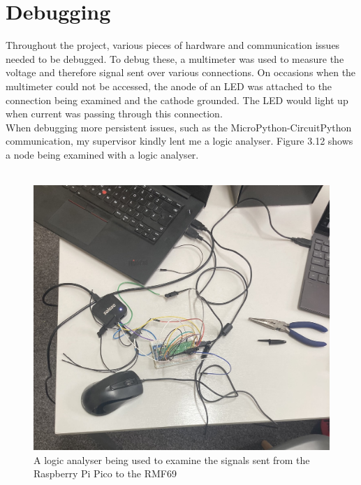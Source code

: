 \documentclass[12pt,a4paper]{report}
\begin{document}
\section{Debugging}
Throughout the project, various pieces of hardware and communication issues needed to be debugged. To debug these, a multimeter was used to measure the voltage and therefore signal sent over various connections. On occasions when the multimeter could not be accessed, the anode of an LED was attached to the connection being examined and the cathode grounded. The LED would light up when current was passing through this connection. \\
When debugging more persistent issues, such as the MicroPython-CircuitPython communication, my supervisor kindly lent me a logic analyser. Figure 3.12 shows a node being examined with a logic analyser. \\ \\ 
\begin{figure}[h]
\begin{center}
\includegraphics[scale=0.2]{logicAnalyser.jpeg}
\end{center}
\caption{A logic analyser being used to examine the signals sent from the Raspberry Pi Pico to the RMF69}
\end{figure}
\end{document}
